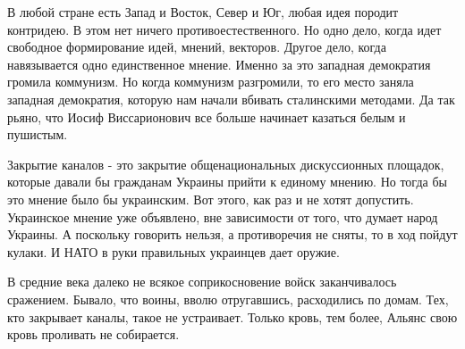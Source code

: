 В любой стране есть Запад и Восток, Север и Юг, любая идея породит контридею. В
этом нет ничего противоестественного. Но одно дело, когда идет свободное
формирование идей, мнений, векторов. Другое дело, когда навязывается одно
единственное мнение. Именно за это западная демократия громила коммунизм. Но
когда коммунизм разгромили, то его место заняла западная демократия, которую
нам начали вбивать сталинскими методами. Да так рьяно, что Иосиф Виссарионович
все больше начинает казаться белым и пушистым. 

Закрытие каналов - это закрытие общенациональных дискуссионных площадок,
которые давали бы гражданам Украины прийти к единому мнению. Но тогда бы это
мнение было бы украинским. Вот этого, как раз и не хотят допустить. Украинское
мнение уже объявлено, вне зависимости от того, что думает народ Украины. А
поскольку говорить нельзя, а противоречия не сняты, то в ход пойдут кулаки. И
НАТО в руки правильных украинцев дает оружие. 

В средние века далеко не всякое соприкосновение войск заканчивалось сражением.
Бывало, что воины, вволю отругавшись, расходились по домам. Тех, кто закрывает
каналы, такое не устраивает. Только кровь, тем более, Альянс свою кровь
проливать не собирается.
